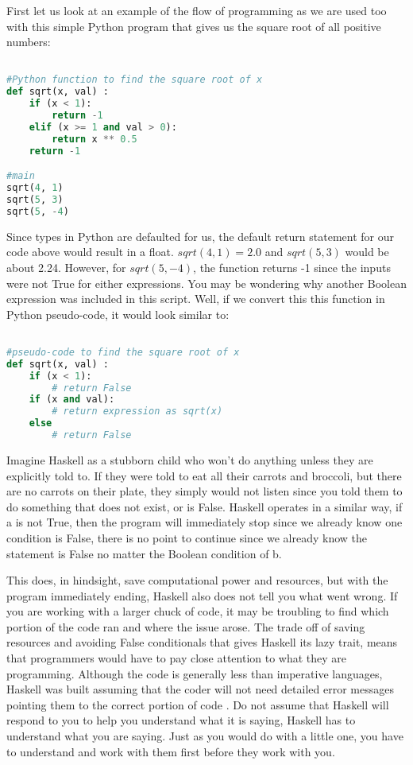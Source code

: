 \documentclass{article}
\begin{document}
\medskip\noindent
First let us look at an example of the flow of programming as we are used too with this simple Python program that gives us the square root of all positive numbers:

\begin{lstlisting}[language=Python]

#Python function to find the square root of x
def sqrt(x, val) :
    if (x < 1):
        return -1
    elif (x >= 1 and val > 0):
        return x ** 0.5
    return -1

#main
sqrt(4, 1)
sqrt(5, 3)
sqrt(5, -4)
\end{lstlisting}
\noindent
Since types in Python are defaulted for us, the default return statement for our code above would result in a float. $sqrt(4, 1) = 2.0$ and $sqrt(5, 3)$ would be about 2.24. However, for $sqrt(5, -4)$, the function returns -1 since the inputs were not True for either expressions. You may be wondering why another Boolean expression was included in this script. Well, if we convert this this function in Python pseudo-code, it would look similar to:

\begin{lstlisting}[language=Python]

#pseudo-code to find the square root of x
def sqrt(x, val) :
    if (x < 1):
        # return False
    if (x and val):
        # return expression as sqrt(x)
    else
        # return False
\end{lstlisting}
\noindent
Imagine Haskell as a stubborn child who won't do anything unless they are explicitly told to. If they were told to eat all their carrots and broccoli, but there are no carrots on their plate, they simply would not listen since you told them to do something that does not exist, or is False. Haskell operates in a similar way, if a is not True, then the program will immediately stop since we already know one condition is False, there is no point to continue since we already know the statement is False no matter the Boolean condition of b. 

\medskip\noindent
This does, in hindsight, save computational power and resources, but with the program immediately ending, Haskell also does not tell you what went wrong. If you are working with a larger chuck of code, it may be troubling to find which portion of the code ran and where the issue arose. The trade off of saving resources and avoiding False conditionals that gives Haskell its lazy trait, means that programmers would have to pay close attention to what they are programming. Although the code is generally less than imperative languages, Haskell was built assuming that the coder will not need detailed error messages pointing them to the correct portion of code \cite{LYH}. Do not assume that Haskell will respond to you to help you understand what it is saying, Haskell has to understand what you are saying. Just as you would do with a little one, you have to understand and work with them first before they work with you.
\end{document}
